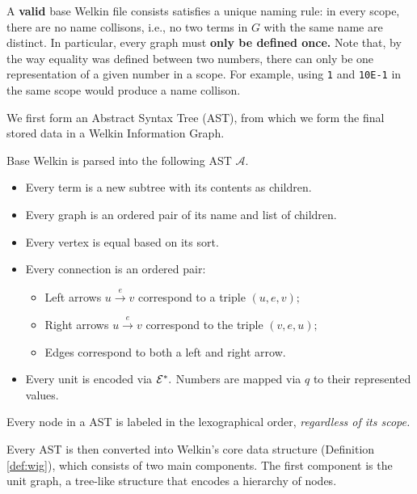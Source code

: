 \begin{itemize}
\begin{definition}
A \textbf{valid} base Welkin file consists satisfies a unique naming rule: in every scope, there are no name collisons, i.e., no two terms in $G$ with the same name are distinct. %
In particular, every graph must \textbf{only be defined once.} Note that, by the way equality was defined between two numbers,
there can only be one representation of a given number in a scope. For example, using \texttt{1} and \texttt{10E-1} in the same scope would produce a name collison.
\end{definition}
We first form an Abstract Syntax Tree (AST), from which we form the final stored data in a Welkin Information Graph.
\begin{definition}
  Base Welkin is parsed into the following AST $\mathcal{A}.$
  \begin{itemize}
	\item Every term is a new subtree with its contents as children.
  \item Every graph is an ordered pair of its name and list of children.
  \item Every vertex is equal based on its sort.
    \item Every connection is an ordered pair:
		  \begin{itemize}
			\item Left arrows $u \xrightarrow{e} v$ correspond to a triple $(u, e, v);$
			\item Right arrows $u \xrightarrow{e} v$ correspond to the triple $(v, e, u);$
			\item Edges correspond to both a left and right arrow.
		  \end{itemize}
	\item Every unit is encoded via $\mathcal{E}^{*}.$ Numbers are mapped via $q$ to their represented values.
  \end{itemize}
\end{definition}
\label{def:unit-graph}


Every node in a AST is labeled in the lexographical order, \textit{regardless of its scope.}

Every AST is then converted into Welkin's core data structure (Definition \ref{def:wig}), which consists of two main components. The first component is the unit graph, a tree-like structure that encodes a hierarchy of nodes.


\end{itemize}
